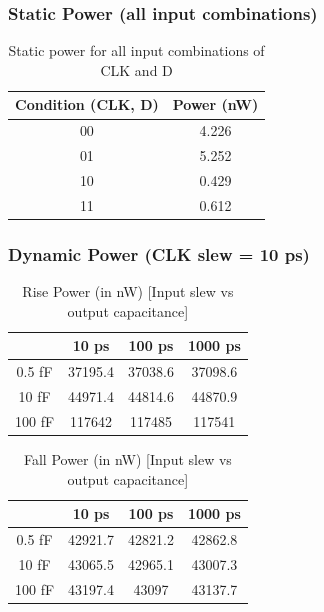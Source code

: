 \documentclass[12pt]{article}
\begin{document}
\subsubsection{Static Power (all input combinations)}
\begin{table}[H]
	\centering
	\begin{tabular}{|c|c|}
		\hline
		Condition (CLK, D) & Power (nW) \\ \hline
		00                 & 4.226      \\ \hline
		01                 & 5.252      \\ \hline
		10                 & 0.429      \\ \hline
		11                 & 0.612      \\ \hline
	\end{tabular}
	\caption{Static power for all input combinations of CLK and D}
\end{table}

\subsubsection{Dynamic Power (CLK slew = 10 ps)}

\begin{table}[H]
	\centering
	\begin{tabular}{|c|c|c|c|}
		\hline
		       & 10 ps   & 100 ps  & 1000 ps \\ \hline
		0.5 fF & 37195.4 & 37038.6 & 37098.6 \\ \hline
		10 fF  & 44971.4 & 44814.6 & 44870.9 \\ \hline
		100 fF & 117642  & 117485  & 117541  \\ \hline
	\end{tabular}
	\caption{Rise Power (in nW) [Input slew vs output capacitance]}
\end{table}

\begin{table}[H]
	\centering
	\begin{tabular}{|c|c|c|c|}
		\hline
		       & 10 ps   & 100 ps  & 1000 ps \\ \hline
		0.5 fF & 42921.7 & 42821.2 & 42862.8 \\ \hline
		10 fF  & 43065.5 & 42965.1 & 43007.3 \\ \hline
		100 fF & 43197.4 & 43097   & 43137.7 \\ \hline
	\end{tabular}
	\caption{Fall Power (in nW) [Input slew vs output capacitance]}
\end{table}
\end{document}
